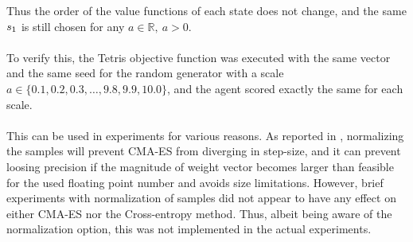 Thus the order of the value functions of 
each state does not change, and the same $s_1$
is still chosen for any $a \in \mathbb{R}, \ a > 0$.\\
\\
To verify this, the Tetris objective function was executed with the
same vector and the same seed for the random generator with a scale
$a \in \{0.1, 0.2,0.3, \dots, 9.8,9.9,10.0\}$, and the agent scored 
exactly the same for each scale.\\
\\
This can be used in experiments for various reasons. As reported 
in \citep{boumaza2009}, normalizing the samples will 
prevent CMA-ES from diverging in step-size,
and it can prevent loosing precision if the magnitude of weight 
vector becomes larger than feasible for the used floating 
point number and avoids size limitations. However, brief experiments 
with normalization of samples did not appear to have any effect 
on either CMA-ES nor the Cross-entropy method. Thus, albeit 
being aware of the normalization option, this was not implemented
in the actual experiments.




